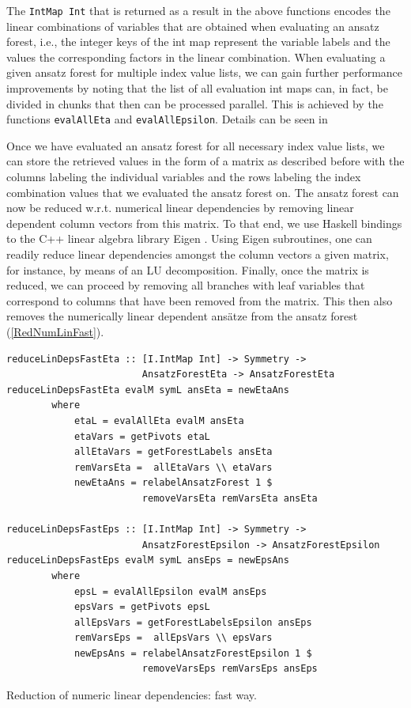 \documentclass[a4paper,12pt, DIV=14, BCOR=5mm, twoside, headsepline, numbers=noenddot]{scrbook}
\begin{document}
The \texttt{IntMap Int} that is returned as a result in the above functions encodes the linear combinations of variables that are obtained when evaluating an ansatz forest, i.e., the integer keys of the int map represent the variable labels and the values the corresponding factors in the linear combination. 
When evaluating a given ansatz forest for multiple index value lists, we can gain further performance improvements by noting that the list of all evaluation int maps can, in fact, be divided in chunks that then can be processed parallel. This is achieved by the functions \texttt{evalAllEta} and \texttt{evalAllEpsilon}. Details can be seen in \cite{sparse-tensor}

Once we have evaluated an ansatz forest for all necessary index value lists, we can store the retrieved values in the form of a matrix as described before with the columns labeling the individual variables and the rows labeling the index combination values that we evaluated the ansatz forest on. The ansatz forest can now be reduced w.r.t. numerical linear dependencies by removing linear dependent column vectors from this matrix. To that end, we use Haskell bindings \cite{HackageEigen} to the C++ linear algebra library Eigen \cite{eigenweb}. Using Eigen subroutines, one can readily reduce linear dependencies amongst the column vectors a given matrix, for instance, by means of an LU decomposition. Finally, once the matrix is reduced, we can proceed by removing all branches with leaf variables that correspond to columns that have been removed from the matrix. This then also removes the numerically linear dependent ansätze from the ansatz forest (\ref{RedNumLinFast}).
\begin{listing}[hbt!]
\begin{verbatim}
reduceLinDepsFastEta :: [I.IntMap Int] -> Symmetry ->
                        AnsatzForestEta -> AnsatzForestEta
reduceLinDepsFastEta evalM symL ansEta = newEtaAns
        where
            etaL = evalAllEta evalM ansEta
            etaVars = getPivots etaL
            allEtaVars = getForestLabels ansEta
            remVarsEta =  allEtaVars \\ etaVars
            newEtaAns = relabelAnsatzForest 1 $
                        removeVarsEta remVarsEta ansEta

reduceLinDepsFastEps :: [I.IntMap Int] -> Symmetry ->
                        AnsatzForestEpsilon -> AnsatzForestEpsilon
reduceLinDepsFastEps evalM symL ansEps = newEpsAns
        where
            epsL = evalAllEpsilon evalM ansEps
            epsVars = getPivots epsL
            allEpsVars = getForestLabelsEpsilon ansEps
            remVarsEps =  allEpsVars \\ epsVars
            newEpsAns = relabelAnsatzForestEpsilon 1 $
                        removeVarsEps remVarsEps ansEps 
\end{verbatim} 
\caption{Reduction of numeric linear dependencies: fast way.}\label{RedNumLinFast}
\end{listing}
\end{document}

